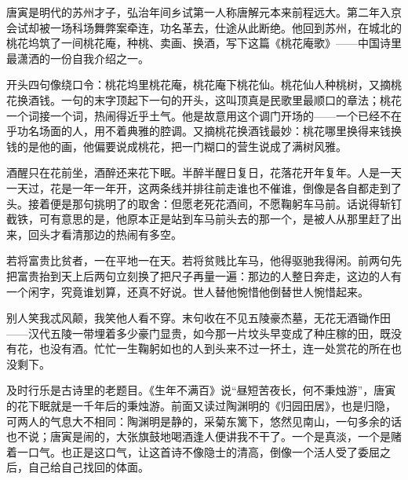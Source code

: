 \begin{appreciation}
唐寅是明代的苏州才子，弘治年间乡试第一人称唐解元本来前程远大。第二年入京会试却被一场科场舞弊案牵连，功名革去，仕途从此断绝。他回到苏州，在城北的桃花坞筑了一间桃花庵，种桃、卖画、换酒，写下这篇《桃花庵歌》——中国诗里最潇洒的一份自我介绍之一。

开头四句像绕口令：桃花坞里桃花庵，桃花庵下桃花仙。桃花仙人种桃树，又摘桃花换酒钱。一句的末字顶起下一句的开头，这叫顶真是民歌里最顺口的章法；桃花一个词接一个词，热闹得近乎土气。他是故意用这个调门开场的——一个已经不在乎功名场面的人，用不着典雅的腔调。又摘桃花换酒钱最妙：桃花哪里换得来钱换钱的是他的画，他偏要说成桃花，把一门糊口的营生说成了满树风雅。

酒醒只在花前坐，酒醉还来花下眠。半醉半醒日复日，花落花开年复年。人是一天一天过，花是一年一年开，这两条线并排往前走谁也不催谁，倒像是各自都走到了头。接着便是那句挑明了的取舍：但愿老死花酒间，不愿鞠躬车马前。话说得斩钉截铁，可有意思的是，他原本正是站到车马前头去的那一个，是被人从那里赶了出来，回头才看清那边的热闹有多空。

若将富贵比贫者，一在平地一在天。若将贫贱比车马，他得驱驰我得闲。前两句先把富贵抬到天上后两句立刻换了把尺子再量一遍：那边的人整日奔走，这边的人有一个闲字，究竟谁划算，还真不好说。世人替他惋惜他倒替世人惋惜起来。

别人笑我忒风颠，我笑他人看不穿。末句收在不见五陵豪杰墓，无花无酒锄作田——汉代五陵一带埋着多少豪门显贵，如今那一片坟头早变成了种庄稼的田，既没有花，也没有酒。忙忙一生鞠躬如也的人到头来不过一抔土，连一处赏花的所在也没剩下。

及时行乐是古诗里的老题目。《生年不满百》说“昼短苦夜长，何不秉烛游”，唐寅的花下眠就是一千年后的秉烛游。前面又读过陶渊明的《归园田居》，也是归隐，可两人的气息大不相同：陶渊明是静的，采菊东篱下，悠然见南山，一句多余的话也不说；唐寅是闹的，大张旗鼓地喝酒逢人便讲我不干了。一个是真淡，一个是赌着一口气。也正是这口气，让这首诗不像隐士的清高，倒像一个活人受了委屈之后，自己给自己找回的体面。
\end{appreciation}
